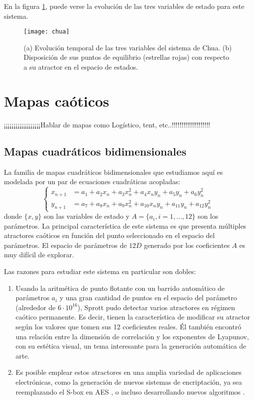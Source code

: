 En la figura \ref{fig:chua}, puede verse la evolución de las tres variables de estado para este sistema.
%
\begin{figure}
\centering\texttt{[image: chua]}
\caption{(a) Evolución temporal de las tres variables del sistema de Chua. (b) Disposición de sus puntos de equilibrio (estrellas rojas) con respecto a su atractor en el espacio de estados.}
\label{fig:chua}
\end{figure}

\section{Mapas caóticos}

¡¡¡¡¡¡¡¡¡¡¡¡¡¡¡¡¡¡¡Hablar de mapas como Logístico, tent, etc..!!!!!!!!!!!!!!!!!!!!

\subsection{Mapas cuadráticos bidimensionales}
\label{ssecQMaps}

La familia de mapas cuadráticos bidimensionales que estudiamos aquí es modelada por un par de ecuaciones cuadráticas acopladas:
%
\begin{equation}\label{eq:mapaSprott}
\left\{\begin{aligned}
x_{n+1}&=a_1+a_2 x_n+a_3 x_n^2+a_4 x_n y_n+a_5 y_n+a_6 y_n^2\\
y_{n+1}&=a_7+a_8 x_n+a_9 x_n^2+a_{10} x_n y_n+a_{11} y_n+a_{12} y_n^2
\end{aligned}
\right.
\end{equation}
%
donde $\{x, y\}$ son las variables de estado y $A = \{a_i, i = 1, \dots, 12 \}$ son los parámetros.
La principal característica de este sistema es que presenta múltiples atractores caóticos en función del punto seleccionado en el espacio del parámetros.
El espacio de parámetros de $12D$ generado por los coeficientes $A$ es muy difícil de explorar.

Las razones para estudiar este sistema en particular son dobles:
%
\begin{enumerate}
	\item Usando la aritmética de punto flotante con un barrido automático de parámetros $a_i$ y una gran cantidad de puntos en el espacio del parámetro (alrededor de $6\cdot10 ^ {16}$), Sprott pudo detectar varios atractores en régimen caótico permanente.
	Es decir, tienen la característica de modificar su atractor según los valores que tomen sus 12 coeficientes reales.
	Él también encontró una relación entre la dimensión de correlación y los exponentes de Lyapunov, con su estética visual, un tema interesante para la generación automática de arte.
	\item Es posible emplear estos atractores en una amplia variedad de aplicaciones electrónicas, como la generación de nuevos sistemas de encriptación, ya sea reemplazando el S-box en AES \cite{Ahmad2013, Hussain2013}, o incluso desarrollando nuevos algoritmos \cite{Machado2004, Smaoui2009}.
\end{enumerate}

